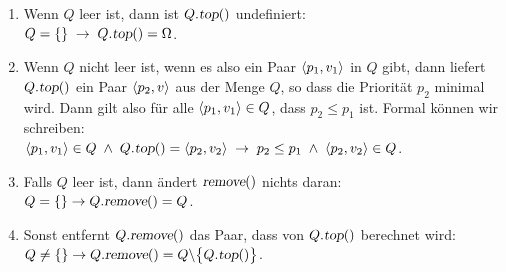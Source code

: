 \begin{Definition}
{\begin{enumerate}
\begin{enumerate}
            Um ein Element $v$ mit einer Priorit\"at $p$ in die Priorit\"ats-Warteschlange 
            $Q$ einzuf\"ugen, reicht es aus, das Paar $\pair(p,v)$ zu der Menge $Q$ hinzuzuf\"ugen.
      \item Wenn $Q$ leer ist, dann ist $Q.\textsl{top}()$ undefiniert: \\[0.1cm]
            \hspace*{1.3cm} $Q = \{\} \;\rightarrow\; Q.\textsl{top}() = \Omega$.
     \item Wenn $Q$ nicht leer ist, wenn es also ein Paar $\pair(p_1, v_1)$ in $Q$
              gibt, dann liefert $Q.\textsl{top}()$ ein Paar $\pair(p_2,v)$ aus der Menge
              $Q$, so dass die Priorit\"at $p_2$ minimal wird.  Dann gilt also f\"ur
              alle $\pair(p_1,v_1) \in Q$, dass $p_2 \leq p_1$ ist.  Formal k\"onnen wir schreiben:
              \\[0.1cm]
              \hspace*{1.3cm} 
              $\pair(p_1,v_1) \in Q \;\wedge\; Q.\textsl{top}() = \pair(p_2,v_2)
              \;\rightarrow\; p_2 \leq p_1 \;\wedge\; \pair(p_2,v_2) \in Q$.
      \item Falls $Q$ leer ist, dann \"andert $\textsl{remove}()$ nichts daran: \\[0.1cm]
            \hspace*{1.3cm} $Q = \{\} \rightarrow Q.\textsl{remove}() = Q$.
      \item Sonst entfernt $Q.\textsl{remove}()$ das Paar, dass von $Q.\textsl{top}()$ berechnet wird: \\[0.1cm]
            \hspace*{1.3cm} 
            $Q \not= \{\} \rightarrow Q.\textsl{remove}() = Q \backslash \bigl\{ Q.\textsl{top}() \bigr\}$.
      \end{enumerate}
\end{enumerate}
}
\end{Definition}

